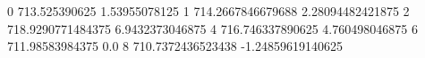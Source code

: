 0 713.525390625 1.53955078125
1 714.2667846679688 2.28094482421875
2 718.9290771484375 6.9432373046875
4 716.746337890625 4.760498046875
6 711.98583984375 0.0
8 710.7372436523438 -1.24859619140625

